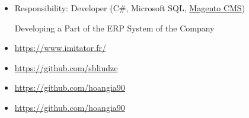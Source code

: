 \documentclass[10pt,a4paper,ragged2e]{altacv}
\begin{document}
	
	\divider
	
	
%		
	\begin{itemize}
		\item Responsibility: Developer (C\#, Microsoft SQL, \href{https://magento.com/}{Magento CMS})
		
		Developing a Part of the ERP System of the Company
	\end{itemize}
	
	\clearpage
	
	
	
	{}{}
	\begin{itemize}
		\item \href{IMITATOR}{https://www.imitator.fr/}
	\end{itemize}
	
	\divider
	
	{}{}
	\begin{itemize}
		\item \href{https://github.com/sbliudze}{https://github.com/sbliudze}
		\item \href{https://github.com/hoangia90}{https://github.com/hoangia90}
	\end{itemize}

	\divider
	
	{}{}
	\begin{itemize}
		\item \href{https://github.com/hoangia90}{https://github.com/hoangia90}
	\end{itemize}
	
\end{document}
